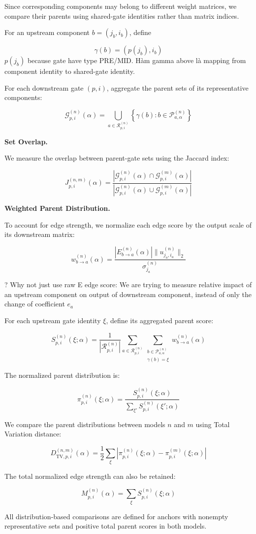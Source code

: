 \documentclass[11pt,a4paper]{article}
\begin{document}
Since corresponding components may belong to different
weight matrices, we compare their parents using
shared-gate identities rather than matrix indices.

For an upstream component $b=(j_b,i_b)$, define

$$
\gamma(b)=(p(j_b),i_b)
$$
$p(j_b)$ because gate have type PRE/MID. Hàm gamma above là mapping from component identity to shared-gate identity.

For each downstream gate $(p,i)$, aggregate the parent
sets of its representative components:

$$
\mathcal{G}_{p,i}^{(n)}(\alpha)
=
\bigcup_{a\in\mathcal{R}_{p,i}^{(n)}}
\left\{
\gamma(b):b\in\mathcal{P}_{a,\alpha}^{(n)}
\right\}
$$

\textbf{Set Overlap.}

We measure the overlap between parent-gate sets using
the Jaccard index:

$$
J_{p,i}^{(n,m)}(\alpha)
=
\frac{
|\mathcal{G}_{p,i}^{(n)}(\alpha)
\cap\mathcal{G}_{p,i}^{(m)}(\alpha)|
}{
|\mathcal{G}_{p,i}^{(n)}(\alpha)
\cup\mathcal{G}_{p,i}^{(m)}(\alpha)|
}
$$

\textbf{Weighted Parent Distribution.}

To account for edge strength, we normalize each
edge score by the output scale of its downstream matrix:

$$
w_{b\rightarrow a}^{(n)}(\alpha)
=
\frac{
|E_{b\rightarrow a}^{(n)}(\alpha)|
\|u_{j_a,i_a}^{(n)}\|_2
}{
\sigma_{j_a}^{(n)}
}
$$

? Why not just use raw E edge score:
We are trying to measure relative impact of an upstream component on output of downstream component, instead of only the change of coefficient $e_a$

For each upstream gate identity $\xi$, define its
aggregated parent score:

$$
S_{p,i}^{(n)}(\xi;\alpha)
=
\frac{1}{|\mathcal{R}_{p,i}^{(n)}|}
\sum_{a\in\mathcal{R}_{p,i}^{(n)}}
\sum_{\substack{
b\in\mathcal{P}_{a,\alpha}^{(n)}\\
\gamma(b)=\xi
}}
w_{b\rightarrow a}^{(n)}(\alpha)
$$

The normalized parent distribution is:

$$
\pi_{p,i}^{(n)}(\xi;\alpha)
=
\frac{
S_{p,i}^{(n)}(\xi;\alpha)
}{
\sum_{\xi'}S_{p,i}^{(n)}(\xi';\alpha)
}
$$

We compare the parent distributions between models
$n$ and $m$ using Total Variation distance:

$$
D_{\mathrm{TV},p,i}^{(n,m)}(\alpha)
=
\frac12\sum_{\xi}
\left|
\pi_{p,i}^{(n)}(\xi;\alpha)
-
\pi_{p,i}^{(m)}(\xi;\alpha)
\right|
$$

The total normalized edge strength can also be retained:

$$
M_{p,i}^{(n)}(\alpha)
=
\sum_{\xi}S_{p,i}^{(n)}(\xi;\alpha)
$$

All distribution-based comparisons are defined for
anchors with nonempty representative sets and positive
total parent scores in both models.
\end{document}
